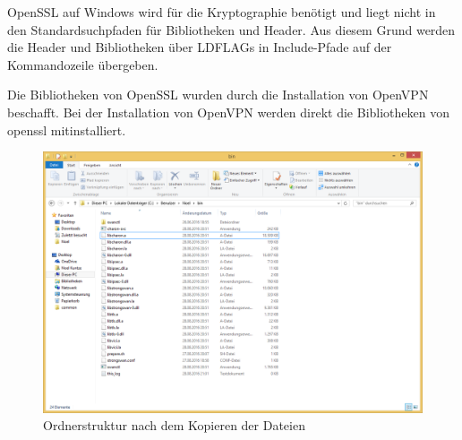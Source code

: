 OpenSSL auf Windows wird für die Kryptographie benötigt und liegt nicht in den Standardsuchpfaden
für Bibliotheken und Header. Aus diesem Grund werden die Header und Bibliotheken
über LDFLAGs in Include-Pfade auf der Kommandozeile übergeben.

Die Bibliotheken von OpenSSL wurden durch die Installation von OpenVPN beschafft.
Bei der Installation von OpenVPN werden direkt die Bibliotheken von openssl mitinstalliert.

\begin{centering}
\begin{figure}
\includegraphics[width=\textwidth]{Bilder/Ordnerstruktur.png}
\caption{Ordnerstruktur nach dem Kopieren der Dateien}
\label{fig:Ordnerstruktur}
\end{figure}
\end{centering}

